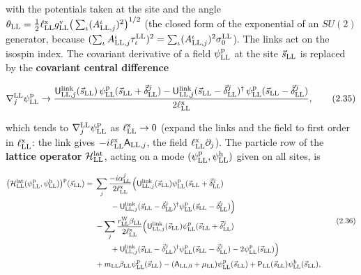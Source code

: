 \documentclass[
  10pt,
]{article}
\begin{document}
with the potentials taken at the site and the angle
\(\theta_{\rm LL}=\tfrac12\ell^{\rm x}_{\rm LL}g^{\rm v}_{\rm LL}\big(\sum_\iota(A^\iota_{{\rm LL},j})^2\big)^{1/2}\)
(the closed form of the exponential of an \(SU(2)\) generator, because
\((\sum_\iota A^\iota_{{\rm LL},j}\tau^{\rm LL}_\iota)^2=\sum_\iota(A^\iota_{{\rm LL},j})^2\sigma^{\rm LL}_0\)).
The links act on the isospin index. The covariant derivative of a field
\(\psi^{\rm p}_{\rm LL}\) at the site \(\vec s_{\rm LL}\) is replaced by
the \textbf{covariant central difference}

\[\nabla^{\rm LL}_j\psi^{\rm p}_{\rm LL}\to\frac{\mathsf U^{\rm link}_{{\rm LL},j}(\vec s_{\rm LL})\,\psi^{\rm p}_{\rm LL}(\vec s_{\rm LL}+\vec\delta^j_{\rm LL})-\mathsf U^{\rm link}_{{\rm LL},j}(\vec s_{\rm LL}-\vec\delta^j_{\rm LL})^\dagger\,\psi^{\rm p}_{\rm LL}(\vec s_{\rm LL}-\vec\delta^j_{\rm LL})}{2\ell^{\rm x}_{\rm LL}},\tag{2.35}\]

which tends to \(\nabla^{\rm LL}_j\psi^{\rm p}_{\rm LL}\) as
\(\ell^{\rm x}_{\rm LL}\to0\) (expand the links and the field to first
order in \(\ell^{\rm x}_{\rm LL}\): the link gives
\(-i\ell^{\rm x}_{\rm LL}\mathsf A_{{\rm LL},j}\), the field
\(\ell^{\rm x}_{\rm LL}\partial_j\)). The particle row of the
\textbf{lattice operator} \(\mathcal H^{\rm lat}_{\rm LL}\), acting on a
mode \((\psi^{\rm p}_{\rm LL},\psi^{\rm h}_{\rm LL})\) given on all
sites, is

\[\begin{aligned}
\big(\mathcal H^{\rm lat}_{\rm LL}(\psi^{\rm p}_{\rm LL},\psi^{\rm h}_{\rm LL})\big)^{\rm p}(\vec s_{\rm LL})={}&\sum_j\frac{-i\alpha^j_{\rm LL}}{2\ell^{\rm x}_{\rm LL}}\Big(\mathsf U^{\rm link}_{{\rm LL},j}(\vec s_{\rm LL})\psi^{\rm p}_{\rm LL}(\vec s_{\rm LL}+\vec\delta^j_{\rm LL})\\
&\qquad-\mathsf U^{\rm link}_{{\rm LL},j}(\vec s_{\rm LL}-\vec\delta^j_{\rm LL})^\dagger\psi^{\rm p}_{\rm LL}(\vec s_{\rm LL}-\vec\delta^j_{\rm LL})\Big)\\
&-\sum_j\frac{r^{\rm W}_{\rm LL}\beta_{\rm LL}}{2\ell^{\rm x}_{\rm LL}}\Big(\mathsf U^{\rm link}_{{\rm LL},j}(\vec s_{\rm LL})\psi^{\rm p}_{\rm LL}(\vec s_{\rm LL}+\vec\delta^j_{\rm LL})\\
&\qquad+\mathsf U^{\rm link}_{{\rm LL},j}(\vec s_{\rm LL}-\vec\delta^j_{\rm LL})^\dagger\psi^{\rm p}_{\rm LL}(\vec s_{\rm LL}-\vec\delta^j_{\rm LL})-2\psi^{\rm p}_{\rm LL}(\vec s_{\rm LL})\Big)\\
&+m_{\rm LL}\beta_{\rm LL}\psi^{\rm p}_{\rm LL}(\vec s_{\rm LL})-(\mathsf A_{{\rm LL},0}+\mu_{\rm LL})\psi^{\rm p}_{\rm LL}(\vec s_{\rm LL})+\mathsf P_{\rm LL}(\vec s_{\rm LL})\psi^{\rm h}_{\rm LL}(\vec s_{\rm LL}),
\end{aligned}\tag{2.36}\]
\end{document}
